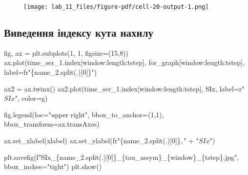 \documentclass[
  letterpaper,
]{report}
\newenvironment{Shaded}{\begin{snugshade}}{\end{snugshade}}
\newcommand{\DecValTok}[1]{\textcolor[rgb]{0.68,0.00,0.00}{#1}}
\newcommand{\NormalTok}[1]{\textcolor[rgb]{0.00,0.23,0.31}{#1}}
\newcommand{\OperatorTok}[1]{\textcolor[rgb]{0.37,0.37,0.37}{#1}}
\newcommand{\SpecialCharTok}[1]{\textcolor[rgb]{0.37,0.37,0.37}{#1}}
\newcommand{\SpecialStringTok}[1]{\textcolor[rgb]{0.13,0.47,0.30}{#1}}
\newcommand{\StringTok}[1]{\textcolor[rgb]{0.13,0.47,0.30}{#1}}
\newcommand{\VerbatimStringTok}[1]{\textcolor[rgb]{0.13,0.47,0.30}{#1}}
\begin{document}
\begin{figure}[H]

{\centering \texttt{[image: lab\_11\_files/figure-pdf/cell-20-output-1.png]}

}

\end{figure}

\hypertarget{ux432ux438ux432ux435ux434ux435ux43dux43dux44f-ux456ux43dux434ux435ux43aux441ux443-ux43aux443ux442ux430-ux43dux430ux445ux438ux43bux443}{%
\subsection{Виведення індексу кута
нахилу}\label{ux432ux438ux432ux435ux434ux435ux43dux43dux44f-ux456ux43dux434ux435ux43aux441ux443-ux43aux443ux442ux430-ux43dux430ux445ux438ux43bux443}}

\begin{Shaded}
\begin{Highlighting}[]
\NormalTok{fig, ax }\OperatorTok{=}\NormalTok{ plt.subplots(}\DecValTok{1}\NormalTok{, }\DecValTok{1}\NormalTok{, figsize}\OperatorTok{=}\NormalTok{(}\DecValTok{15}\NormalTok{,}\DecValTok{8}\NormalTok{))}
\NormalTok{ax.plot(time\_ser\_1.index[window:length:tstep], for\_graph[window:length:tstep], label}\OperatorTok{=}\VerbatimStringTok{fr"}\SpecialCharTok{\{}\NormalTok{name\_2}\SpecialCharTok{.}\NormalTok{split(}\StringTok{\textquotesingle{}.\textquotesingle{}}\NormalTok{)[}\DecValTok{0}\NormalTok{]}\SpecialCharTok{\}}\VerbatimStringTok{"}\NormalTok{)}

\NormalTok{ax2 }\OperatorTok{=}\NormalTok{ ax.twinx()}
\NormalTok{ax2.plot(time\_ser\_1.index[window:length:tstep], SIx, label}\OperatorTok{=}\VerbatimStringTok{r"$ SIx $"}\NormalTok{, color}\OperatorTok{=}\StringTok{\textquotesingle{}g\textquotesingle{}}\NormalTok{)}

\NormalTok{fig.legend(loc}\OperatorTok{=}\StringTok{"upper right"}\NormalTok{, bbox\_to\_anchor}\OperatorTok{=}\NormalTok{(}\DecValTok{1}\NormalTok{,}\DecValTok{1}\NormalTok{), bbox\_transform}\OperatorTok{=}\NormalTok{ax.transAxes)}

\NormalTok{ax.set\_xlabel(xlabel)}
\NormalTok{ax.set\_ylabel(}\VerbatimStringTok{fr"}\SpecialCharTok{\{}\NormalTok{name\_2}\SpecialCharTok{.}\NormalTok{split(}\StringTok{\textquotesingle{}.\textquotesingle{}}\NormalTok{)[}\DecValTok{0}\NormalTok{]}\SpecialCharTok{\}}\VerbatimStringTok{$,$"} \OperatorTok{+} \StringTok{"$SIx$"}\NormalTok{)}

\NormalTok{plt.savefig(}\SpecialStringTok{f"SIx\_}\SpecialCharTok{\{}\NormalTok{name\_2}\SpecialCharTok{.}\NormalTok{split(}\StringTok{\textquotesingle{}.\textquotesingle{}}\NormalTok{)[}\DecValTok{0}\NormalTok{]}\SpecialCharTok{\}}\SpecialStringTok{\_}\SpecialCharTok{\{}\NormalTok{tau\_assym}\SpecialCharTok{\}}\SpecialStringTok{\_}\SpecialCharTok{\{}\NormalTok{window}\SpecialCharTok{\}}\SpecialStringTok{\_}\SpecialCharTok{\{}\NormalTok{tstep}\SpecialCharTok{\}}\SpecialStringTok{.jpg"}\NormalTok{, bbox\_inches}\OperatorTok{=}\StringTok{"tight"}\NormalTok{)}
\NormalTok{plt.show()}
\end{Highlighting}
\end{Shaded}
\end{document}
